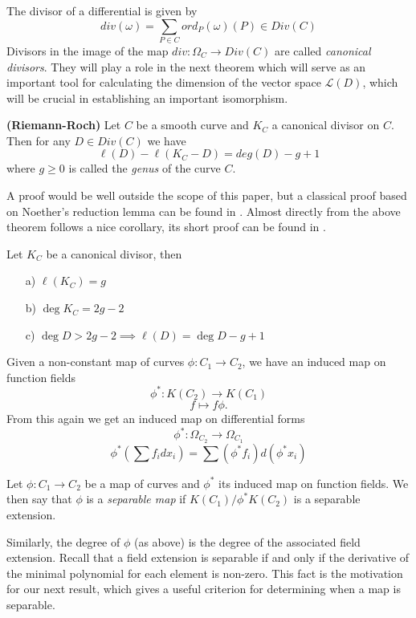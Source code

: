 The divisor of a differential is given by
$$ div(\omega) = \sum_{P\in C} ord_P(\omega)(P) \in Div(C)$$
Divisors in the image of the map $div: \Omega_C \rightarrow Div(C)$ are called
\emph{canonical divisors}. They will play a role in the next theorem which will
serve as an important tool for calculating the dimension of the vector space
$\mathscr{L}(D)$, which will be crucial in establishing an important isomorphism.

\begin{thm}
 \textbf{(Riemann-Roch)}
  Let $C$ be a smooth curve and $K_C$ a canonical divisor on $C$. Then for
any $D \in Div(C)$ we have
$$ \ell(D) - \ell(K_C - D) = deg(D) - g + 1 $$
where $g \geq 0$ is called the \emph{genus} of the curve $C$.
\end{thm}

 A proof would be well outside the scope of this paper, but a classical proof based
on Noether's reduction lemma can be found in \cite{Fulton}. Almost directly from the
above theorem follows a nice corollary, its short proof can be found in \cite{AEC}.

\begin{cor} \label{rrcor}
Let $K_C$ be a canonical divisor, then
 \begin{enumerate}
  \item[a)] $\ell(K_C) = g$
  \item[b)] $\deg K_C = 2g - 2$
  \item[c)] $\deg D > 2g - 2 \implies \ell(D) = \deg D - g + 1$ 
 \end{enumerate}
\end{cor}

Given a non-constant map of curves $\phi: C_1 \rightarrow C_2$, we have an induced map
on function fields $$\phi^*: K(C_2) \rightarrow K(C_1)$$
$$f \mapsto f \phi.$$
From this again we get an induced
map on differential forms
$$ \phi^*: \Omega_{C_2} \rightarrow \Omega_{C_1} $$
$$ \phi^*\left(\sum f_i dx_i\right) = \sum (\phi^* f_i) d(\phi^* x_i) $$
\label{diff}

\begin{mydef} 
 Let $\phi: C_1 \rightarrow C_2$ be a map of curves and $\phi^*$ its induced map on
function fields. We then say that $\phi$ is a \emph{separable map} if
$K(C_1)/\phi^* K(C_2)$ is a separable extension.
\end{mydef}

Similarly, the degree of $\phi$ (as above) is the degree of the associated field extension.
Recall that a field extension is separable if and only if the derivative of the minimal
polynomial for each element is non-zero. This fact is the motivation for our next result,
which gives a useful criterion for determining when a map is separable.

